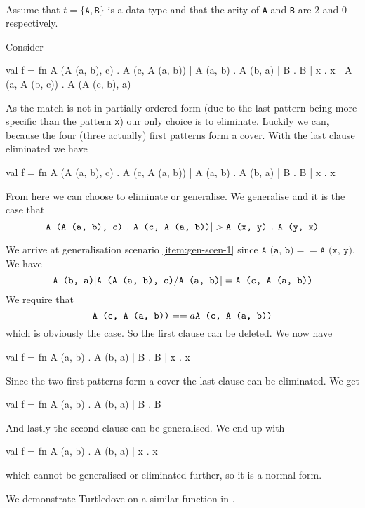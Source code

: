 \begin{example}\ \\
Assume that $t = \{\texttt{A}, \texttt{B}\}$ is a data type and that the arity
of \texttt{A} and \texttt{B} are 2 and 0 respectively.

Consider
\begin{sml}
val f =
fn A (A (a, b), c) . A (c, A (a, b))
 | A (a, b)        . A (b, a)
 | B               . B
 | x               . x
 | A (a, A (b, c)) . A (A (c, b), a)
\end{sml}
As the match is not in partially ordered form (due to the last pattern being
more specific than the pattern \texttt{x}) our only choice is to
eliminate. Luckily we can, because the four (three actually) first patterns
form a cover. With the last clause eliminated we have

\begin{sml}
val f =
fn A (A (a, b), c) . A (c, A (a, b))
 | A (a, b)        . A (b, a)
 | B               . B
 | x               . x
\end{sml}

From here we can choose to eliminate or generalise. We generalise and it is the
case that
\[
\clause{\texttt{A (A (a, b), c)}}{\texttt{A (c, A (a, b))}}
|>
\clause{\texttt{A (x, y)}}{\texttt{A (y, x)}}
\]

We arrive at generalisation scenario \ref{item:gen-scen-1} since $\texttt{A (a, b)} ==
\texttt{A (x, y)}$. We have
\[
\texttt{A (b, a)}[\texttt{A (A (a, b), c)}/\texttt{A (a, b)}] = \texttt{A (c, A (a, b))}
\]
We require that
\[
\texttt{A (c, A (a, b))}
==a
\texttt{A (c, A (a, b))}
\]
which is obviously the case. So the first clause can be deleted. We now have

\begin{sml}
val f =
fn A (a, b) . A (b, a)
 | B        . B
 | x        . x
\end{sml}

Since the two first patterns form a cover the last clause can be eliminated. We
get

\begin{sml}
val f =
fn A (a, b) . A (b, a)
 | B        . B
\end{sml}

And lastly the second clause can be generalised. We end up with

\begin{sml}
val f =
fn A (a, b) . A (b, a)
 | x        . x
\end{sml}

which cannot be generalised or eliminated further, so it is a normal form.

We demonstrate Turtledove on a similar function in
.
\end{example}


